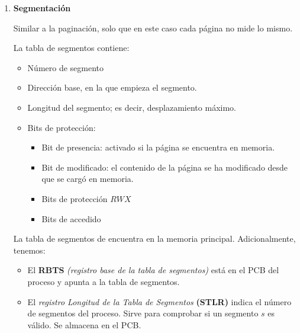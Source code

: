 \begin{enumerate}
    \item \textbf{Segmentación}

    Similar a la paginación, solo que en este caso cada página no mide lo mismo.

    La tabla de segmentos contiene:
    \begin{itemize}
        \item Número de segmento
        \item Dirección base, en la que empieza el segmento.
        \item Longitud del segmento; es decir, desplazamiento máximo.
        \item Bits de protección:
        \begin{itemize}
            \item Bit de presencia: activado si la página se encuentra en memoria.
            \item Bit de modificado: el contenido de la página se ha modificado desde que se cargó en memoria.
            \item Bits de protección $RWX$
            \item Bits de accedido
        \end{itemize}
    \end{itemize}

    La tabla de segmentos de encuentra en la memoria principal. Adicionalmente, tenemos:
    \begin{itemize}
        \item El \textbf{RBTS} \textit{(registro base de la tabla de segmentos)} está en el PCB del proceso y apunta a la tabla de segmentos.

        \item El \textit{registro Longitud de la Tabla de Segmentos} \textbf{(STLR)}  indica el número de segmentos del proceso. Sirve para comprobar si un segmento $s$ es válido. Se almacena en el PCB.
    \end{itemize}
    
\end{enumerate}